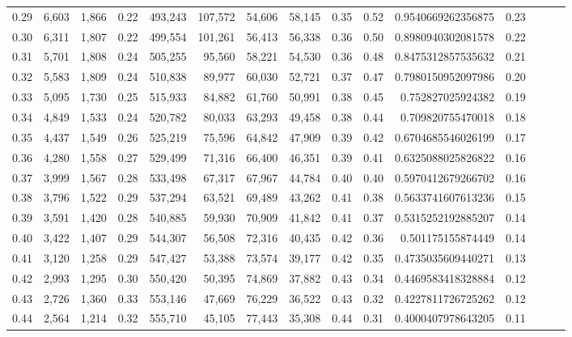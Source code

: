 \begin{tabular}{rrrrrrrrrrrrrrr}
0.29 &   6,603 &  1,866 &  0.22 &  493,243 &  107,572 &   54,606 &   58,145 &  0.35 &  0.52 &    0.9540669262356875 &      0.23 \\
0.30 &   6,311 &  1,807 &  0.22 &  499,554 &  101,261 &   56,413 &   56,338 &  0.36 &  0.50 &    0.8980940302081578 &      0.22 \\
0.31 &   5,701 &  1,808 &  0.24 &  505,255 &   95,560 &   58,221 &   54,530 &  0.36 &  0.48 &    0.8475312857535632 &      0.21 \\
0.32 &   5,583 &  1,809 &  0.24 &  510,838 &   89,977 &   60,030 &   52,721 &  0.37 &  0.47 &    0.7980150952097986 &      0.20 \\
0.33 &   5,095 &  1,730 &  0.25 &  515,933 &   84,882 &   61,760 &   50,991 &  0.38 &  0.45 &     0.752827025924382 &      0.19 \\
0.34 &   4,849 &  1,533 &  0.24 &  520,782 &   80,033 &   63,293 &   49,458 &  0.38 &  0.44 &     0.709820755470018 &      0.18 \\
0.35 &   4,437 &  1,549 &  0.26 &  525,219 &   75,596 &   64,842 &   47,909 &  0.39 &  0.42 &    0.6704685546026199 &      0.17 \\
0.36 &   4,280 &  1,558 &  0.27 &  529,499 &   71,316 &   66,400 &   46,351 &  0.39 &  0.41 &    0.6325088025826822 &      0.16 \\
0.37 &   3,999 &  1,567 &  0.28 &  533,498 &   67,317 &   67,967 &   44,784 &  0.40 &  0.40 &    0.5970412679266702 &      0.16 \\
0.38 &   3,796 &  1,522 &  0.29 &  537,294 &   63,521 &   69,489 &   43,262 &  0.41 &  0.38 &    0.5633741607613236 &      0.15 \\
0.39 &   3,591 &  1,420 &  0.28 &  540,885 &   59,930 &   70,909 &   41,842 &  0.41 &  0.37 &    0.5315252192885207 &      0.14 \\
0.40 &   3,422 &  1,407 &  0.29 &  544,307 &   56,508 &   72,316 &   40,435 &  0.42 &  0.36 &     0.501175155874449 &      0.14 \\
0.41 &   3,120 &  1,258 &  0.29 &  547,427 &   53,388 &   73,574 &   39,177 &  0.42 &  0.35 &    0.4735035609440271 &      0.13 \\
0.42 &   2,993 &  1,295 &  0.30 &  550,420 &   50,395 &   74,869 &   37,882 &  0.43 &  0.34 &    0.4469583418328884 &      0.12 \\
0.43 &   2,726 &  1,360 &  0.33 &  553,146 &   47,669 &   76,229 &   36,522 &  0.43 &  0.32 &    0.4227811726725262 &      0.12 \\
0.44 &   2,564 &  1,214 &  0.32 &  555,710 &   45,105 &   77,443 &   35,308 &  0.44 &  0.31 &    0.4000407978643205 &      0.11 \\

\end{tabular}
